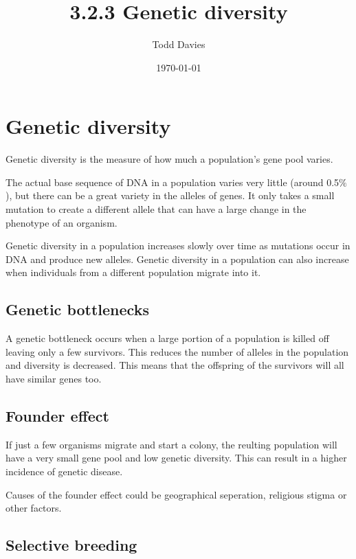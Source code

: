 \documentclass{article}
\author{Todd Davies}
\title{3.2.3 Genetic diversity}
\date{\today}
\begin{document}
\lhead{\today}

\maketitle

\section*{Genetic diversity}
\thispagestyle{empty}

Genetic diversity is the measure of how much a population's gene pool varies.

The actual base sequence of DNA in a population varies very little (around
0.5$\%$), but there can be a great variety in the alleles of genes. It only
takes a small mutation to create a different allele that can have a large change
in the phenotype of an organism. 

Genetic diversity in a population increases slowly over time as mutations occur
in DNA and produce new alleles. Genetic diversity in a population can also
increase when individuals from a different population migrate into it.

\subsection*{Genetic bottlenecks}

A genetic bottleneck occurs when a large portion of a population is killed off
leaving only a few survivors. This reduces the number of alleles in the
population and diversity is decreased. This means that the offspring of the
survivors will all have similar genes too.

\subsection*{Founder effect}

If just a few organisms migrate and start a colony, the reulting population will
have a very small gene pool and low genetic diversity. This can result in a
higher incidence of genetic disease.

Causes of the founder effect could be geographical seperation, religious stigma
or other factors.

\subsection*{Selective breeding}
\end{document}
